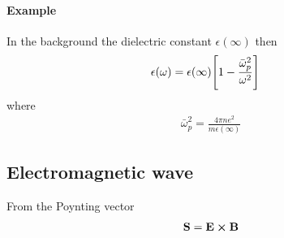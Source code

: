 \documentclass[../main.tex]{subfiles}
\begin{document}
\paragraph*{Example} In the background the dielectric constant $\epsilon(\infty)$ then
\begin{align*}
    \epsilon(\omega) &= \epsilon(\infty)\qt[1 - \frac{\bar{\omega}_p^2}{\omega^2}]
\end{align*}
where
\begin{align*}
    \bar{\omega}_p^2 = \frac{4\pi ne^2}{m\epsilon(\infty)}
\end{align*}
\subsection*{Electromagnetic wave} 
From the Poynting vector
\begin{align*}
    \vb S = \vb E \cross \vb B
\end{align*} 
\end{document}
